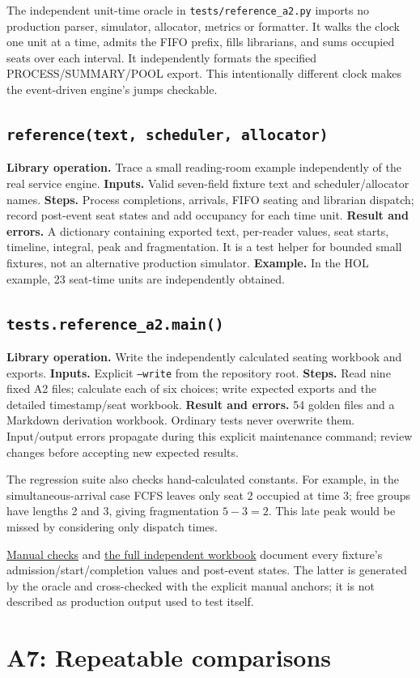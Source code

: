 \documentclass[11pt,a4paper]{article}
\newcommand{\routine}[2]{\subsection{\texorpdfstring{\texttt{#1}}{#2}}}
\newcommand{\librarymeaning}{\textbf{Library operation.} }
\newcommand{\arguments}{\textbf{Inputs.} }
\newcommand{\steps}{\textbf{Steps.} }
\newcommand{\result}{\textbf{Result and errors.} }
\newcommand{\example}{\textbf{Example.} }
\begin{document}
The independent unit-time oracle in \texttt{tests/reference\_a2.py} imports
no production parser, simulator, allocator, metrics or formatter. It walks the
clock one unit at a time, admits the FIFO prefix, fills librarians, and sums
occupied seats over each interval. It independently formats the specified
PROCESS/SUMMARY/POOL export. This intentionally different clock makes the
event-driven engine's jumps checkable.

\routine{reference(text, scheduler, allocator)}{Independent reference}
\librarymeaning Trace a small reading-room example independently of the real
service engine.
\arguments Valid seven-field fixture text and scheduler/allocator names.
\steps Process completions, arrivals, FIFO seating and librarian dispatch;
record post-event seat states and add occupancy for each time unit.
\result A dictionary containing exported text, per-reader values, seat starts,
timeline, integral, peak and fragmentation. It is a test helper for bounded
small fixtures, not an alternative production simulator.
\example In the HOL example, 23 seat-time units are independently obtained.

\routine{tests.reference\_a2.main()}{Golden export helper}
\librarymeaning Write the independently calculated seating workbook and exports.
\arguments Explicit \texttt{--write} from the repository root.
\steps Read nine fixed A2 files; calculate each of six choices; write expected
exports and the detailed timestamp/seat workbook.
\result 54 golden files and a Markdown derivation workbook. Ordinary tests
never overwrite them. Input/output errors propagate during this explicit
maintenance command; review changes before accepting new expected results.

The regression suite also checks hand-calculated constants. For example,
in the simultaneous-arrival case FCFS leaves only seat 2 occupied at time 3;
free groups have lengths 2 and 3, giving fragmentation $5-3=2$. This late
peak would be missed by considering only dispatch times.

\href{fixture_checks.md}{Manual checks} and
\href{fixture_derivations.md}{the full independent workbook} document every
fixture's admission/start/completion values and post-event states. The latter
is generated by the oracle and cross-checked with the explicit manual anchors;
it is not described as production output used to test itself.

\section{A7: Repeatable comparisons}
\end{document}
